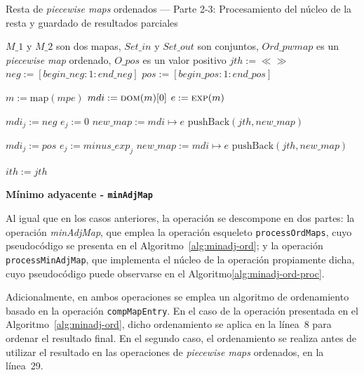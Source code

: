 \begin{algorithm}
\caption{Resta de \textit{piecewise maps} ordenados — Parte 2-3: Procesamiento del núcleo de la resta y guardado de resultados parciales}
\label{alg:resta-nuecleo-ord3}
\begin{algorithmic}[1]
\Require $M\_1$ y $M\_2$ son dos mapas, $Set\_in$ y $Set\_out$ son conjuntos, $Ord\_pwmap$ es un \textit{piecewise map} ordenado, $O\_pos$ es un valor positivo
 \State $jth := \ll\gg$
        \State $neg := [begin\_neg: 1: end\_neg]$
        \State $pos := [begin\_pos: 1: end\_pos]$

            \State $m := \mathrm{map}(mpe)$
            \State $mdi := \Call{dom}{m}[0]$
            \State $e := \Call{exp}{m}$

                \State $mdi_j := neg$
                \State $e_j := 0$
                \State $new\_map := mdi \mapsto e$
                \State $\mathrm{pushBack}(jth, new\_map)$
            \EndIf

                \State $mdi_j := pos$
                \State $e_j := minus\_exp_j$
                \State $new\_map := mdi \mapsto e$
                \State $\mathrm{pushBack}(jth, new\_map)$
            \EndIf
        \EndFor

        \State $ith := jth$
\EndFunction
\end{algorithmic}
\end{algorithm}

{\bf Mínimo adyacente - \texttt{minAdjMap}}

Al igual que en los casos anteriores, la operación se descompone en dos partes:  
la operación \textit{minAdjMap}, que emplea la operación esqueleto \texttt{processOrdMaps}, cuyo pseudocódigo se presenta en el Algoritmo~\ref{alg:minadj-ord};  
y la operación \texttt{processMinAdjMap}, que implementa el núcleo de la operación propiamente dicha, 
cuyo pseudocódigo puede observarse en el Algoritmo\ref{alg:minadj-ord-proc}.

Adicionalmente, en ambos operaciones se emplea un algoritmo de ordenamiento 
basado en la operación \texttt{compMapEntry}.  
En el caso de la operación presentada en el Algoritmo~\ref{alg:minadj-ord}, dicho ordenamiento 
se aplica en la línea~8 para ordenar el resultado final.  
En el segundo caso, el ordenamiento se realiza antes de utilizar el resultado 
en las operaciones de \textit{piecewise maps} ordenados, en la línea~29.

